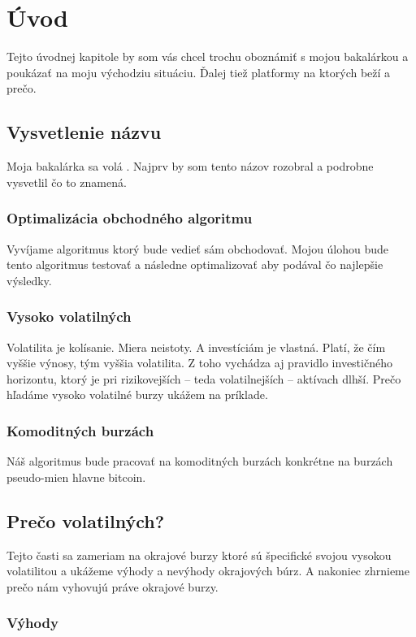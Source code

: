 \chapter{Úvod}\label{chap:intro}

Tejto úvodnej kapitole by som vás chcel trochu oboznámiť s mojou bakalárkou a poukázať na moju východziu situáciu. Ďalej tiež platformy na ktorých beží a prečo.
\section{Vysvetlenie názvu}
Moja bakalárka sa volá . Najprv by som tento názov rozobral a podrobne vysvetlil čo to znamená.
\subsection{Optimalizácia obchodného algoritmu}
Vyvíjame algoritmus ktorý bude vedieť sám obchodovať. Mojou úlohou bude tento algoritmus testovať a následne optimalizovať aby podával čo najlepšie výsledky.
\subsection{Vysoko volatilných}
Volatilita\cite{Volatilita} je kolísanie. Miera neistoty. A investíciám je vlastná. Platí, že čím vyššie výnosy, tým vyššia volatilita. Z toho vychádza aj pravidlo investičného horizontu, ktorý je pri rizikovejších – teda volatilnejších – aktívach dlhší. Prečo hľadáme  vysoko volatilné burzy ukážem na príklade.
\subsection{Komoditných burzách}
Náš algoritmus bude pracovať na komoditných burzách konkrétne na burzách pseudo-mien hlavne bitcoin. 

\section{Prečo volatilných?}
Tejto časti sa zameriam na okrajové burzy ktoré sú špecifické svojou vysokou volatilitou
a ukážeme výhody a nevýhody okrajových búrz. A nakoniec zhrnieme prečo nám vyhovujú práve okrajové burzy.
\subsection{Výhody}
